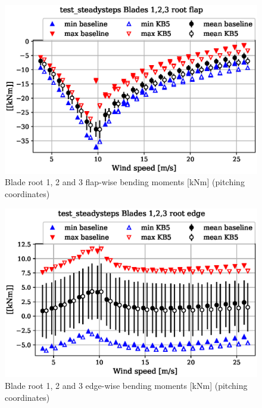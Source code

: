 \begin{figure}[!ht]
\begin{center}
	\includegraphics[width=.85\linewidth]{figures/baseline-vs-KB6/test_steadysteps/blade1-blade1-node-001-momentvec-x_AA0007_AA0003.eps}
\end{center}
\caption{Blade root 1, 2 and 3 flap-wise bending moments [kNm] (pitching coordinates)}
\label{fig:baseline-vs-KB6:test_steadysteps:blade-root-flap}
\end{figure}

\begin{figure}[!ht]
\begin{center}
	\includegraphics[width=.85\linewidth]{figures/baseline-vs-KB6/test_steadysteps/blade1-blade1-node-001-momentvec-y_AA0007_AA0003.eps}
\end{center}
\caption{Blade root 1, 2 and 3 edge-wise bending moments [kNm] (pitching coordinates)}
\label{fig:baseline-vs-KB6:test_steadysteps:blade-root-edge}
\end{figure}

